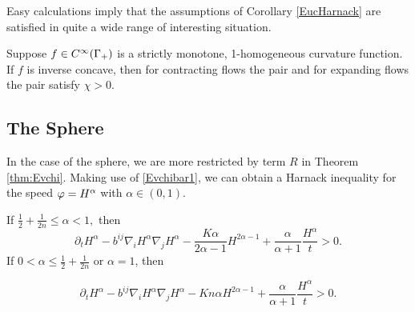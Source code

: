 \documentclass{amsart}
\begin{document}

Easy calculations imply that the assumptions of Corollary \ref{EucHarnack} are satisfied in quite a wide range of interesting situation.

\begin{corollary}
Suppose $f\in C^{\infty}(\Gamma_+)$ is a strictly monotone, 1-homogeneous curvature function. If $f$ is inverse concave, then for contracting flows the pair
and for expanding flows the pair
satisfy $\chi>0$.
\end{corollary}

\subsection{The Sphere}

In the case of the sphere, we are more restricted by term $R$ in Theorem \ref{thm:Evchi}. Making use of \cref{Evchibar1}, we can obtain a Harnack inequality for the speed \(\varphi = H^{\alpha}\) with \(\alpha \in (0,1)\).

\begin{theorem}\label{thm: main 1}
If $\frac{1}{2}+\frac{1}{2n}\leq {\alpha}< 1,$ then
\[
\partial_t H^{\alpha} - b^{ij}\nabla_iH^{\alpha}\nabla_jH^{\alpha} - \frac{K {\alpha}}{2{\alpha}-1}H^{2{\alpha}-1} + \frac{{\alpha}}{{\alpha}+1} \frac{H^{\alpha}}{t} > 0.
\]
If $0<{\alpha}\leq \frac{1}{2} + \frac{1}{2n}$ or $\alpha=1$, then

\[
\partial_t H^{\alpha} - b^{ij}\nabla_iH^{\alpha}\nabla_jH^{\alpha} - K n{\alpha}H^{2{\alpha}-1} + \frac{{\alpha}}{{\alpha}+1} \frac{H^{\alpha}}{t} > 0.
\]
\end{theorem}
\end{document}
